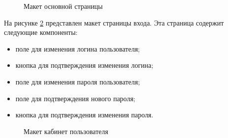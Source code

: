 \begin{figure}[H]
	\caption{Макет основной страницы}
	\label{main_maket:image}
\end{figure}

На рисунке \ref{cabinet_maket:image} представлен макет страницы входа. Эта страница содержит следующие компоненты:
\begin{itemize}
	\item поле для изменения логина пользователя;
	\item кнопка для подтверждения изменения логина;
	\item поле для изменения пароля пользователя;
	\item поле для подтверждения нового пароля;
	\item кнопка для подтверждения изменения пароля.
\end{itemize}

\begin{figure}[H]
	\caption{Макет кабинет пользователя}
	\label{cabinet_maket:image}
\end{figure}